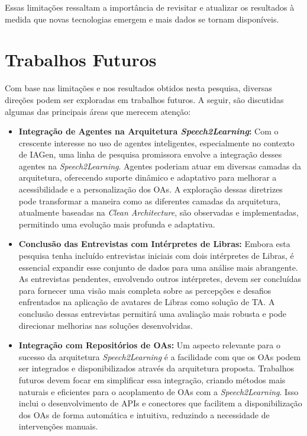 Essas limitações ressaltam a importância de revisitar e atualizar os resultados à medida que novas tecnologias emergem e mais dados se tornam disponíveis.

\section{Trabalhos Futuros}

Com base nas limitações e nos resultados obtidos nesta pesquisa, diversas direções podem ser exploradas em trabalhos futuros. A seguir, são discutidas algumas das principais áreas que merecem atenção:

\begin{itemize}

    \item \textbf{Integração de Agentes na Arquitetura \textit{Speech2Learning}:} Com o crescente interesse no uso de agentes inteligentes, especialmente no contexto de IAGen, uma linha de pesquisa promissora envolve a integração desses agentes na \textit{Speech2Learning}. Agentes poderiam atuar em diversas camadas da arquitetura, oferecendo suporte dinâmico e adaptativo para melhorar a acessibilidade e a personalização dos OAs. A exploração dessas diretrizes pode transformar a maneira como as diferentes camadas da arquitetura, atualmente baseadas na \textit{Clean Architecture}, são observadas e implementadas, permitindo uma evolução mais profunda e adaptativa.

    \item \textbf{Conclusão das Entrevistas com Intérpretes de Libras:} Embora esta pesquisa tenha incluído entrevistas iniciais com dois intérpretes de Libras, é essencial expandir esse conjunto de dados para uma análise mais abrangente. As entrevistas pendentes, envolvendo outros intérpretes, devem ser concluídas para fornecer uma visão mais completa sobre as percepções e desafios enfrentados na aplicação de avatares de Libras como solução de TA. A conclusão dessas entrevistas permitirá uma avaliação mais robusta e pode direcionar melhorias nas soluções desenvolvidas.

    \item \textbf{Integração com Repositórios de OAs:} Um aspecto relevante para o sucesso da arquitetura \textit{Speech2Learning} é a facilidade com que os OAs podem ser integrados e disponibilizados através da arquitetura proposta. Trabalhos futuros devem focar em simplificar essa integração, criando métodos mais naturais e eficientes para o acoplamento de OAs com a \textit{Speech2Learning}. Isso inclui o desenvolvimento de APIs e conectores que facilitem a disponibilização dos OAs de forma automática e intuitiva, reduzindo a necessidade de intervenções manuais.


\end{itemize}
